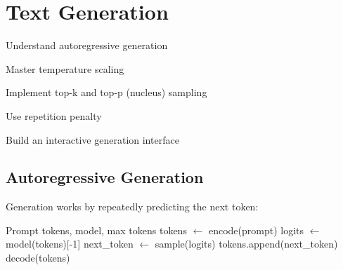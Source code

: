 \chapter{Text Generation}
\label{ch:text-generation}

\begin{objectives}
    \item Understand autoregressive generation
    \item Master temperature scaling
    \item Implement top-k and top-p (nucleus) sampling
    \item Use repetition penalty
    \item Build an interactive generation interface
\end{objectives}

\section{Autoregressive Generation}

Generation works by repeatedly predicting the next token:

\begin{algorithm}[H]
\caption{Autoregressive Text Generation}
\begin{algorithmic}[1]
\Require Prompt tokens, model, max tokens
\State tokens $\gets$ encode(prompt)
    \State logits $\gets$ model(tokens)[-1]  
    \State next\_token $\gets$ sample(logits)  
    \State tokens.append(next\_token)
\EndWhile
\State \Return decode(tokens)
\end{algorithmic}
\end{algorithm}

